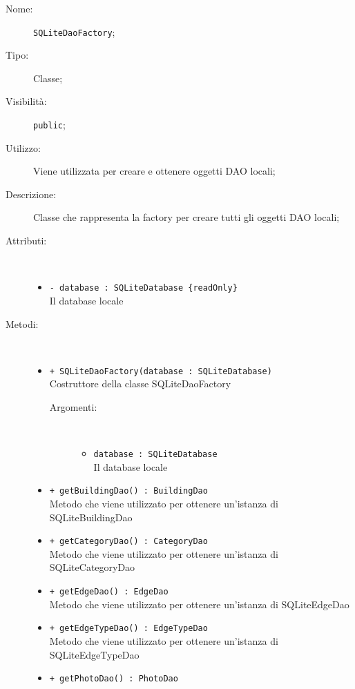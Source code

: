 \documentclass[../DefinizioneDiProdotto.tex]{subfiles}
\begin{document}
\begin{description}
	\item[Nome:] \texttt{SQLiteDaoFactory};
	\item[Tipo:] Classe;
	\item[Visibilità:] \texttt{public};
	\item[Utilizzo:] Viene utilizzata per creare e ottenere oggetti DAO locali;
	\item[Descrizione:] Classe che rappresenta la factory per creare tutti gli oggetti DAO locali;
	\item[Attributi:] \
	\begin{itemize}
		\item \texttt{- database : SQLiteDatabase \{readOnly\}}\\
		Il database locale
		
	\end{itemize}
	\item[Metodi:] \
	\begin{itemize}
		\item \texttt{+ SQLiteDaoFactory(database : SQLiteDatabase)}\\
		Costruttore della classe SQLiteDaoFactory
		\begin{description}
			\item[Argomenti:] \
			\begin{itemize}
				\item \texttt{database : SQLiteDatabase}\\
				Il database locale \end{itemize}
		\end{description}
		\item \texttt{+ getBuildingDao() : BuildingDao}\\
		Metodo che viene utilizzato per ottenere un'istanza di SQLiteBuildingDao
		\item \texttt{+ getCategoryDao() : CategoryDao}\\
		Metodo che viene utilizzato per ottenere un'istanza di SQLiteCategoryDao
		\item \texttt{+ getEdgeDao() : EdgeDao}\\
		Metodo che viene utilizzato per ottenere un'istanza di SQLiteEdgeDao
		\item \texttt{+ getEdgeTypeDao() : EdgeTypeDao}\\
		Metodo che viene utilizzato per ottenere un'istanza di SQLiteEdgeTypeDao
		\item \texttt{+ getPhotoDao() : PhotoDao}\\

\end{itemize}
\end{description}
\end{document}

